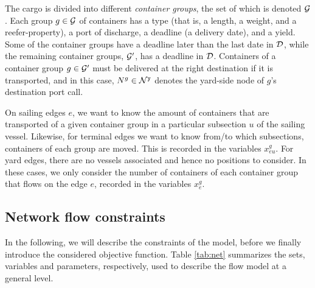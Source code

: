 The cargo is divided into different \emph{container groups}, the set of which is denoted $\mathcal{G}$. Each group $g\in \mathcal{G}$ of containers has a type (that is, a length, a weight, and a reefer-property), a port of discharge, a deadline (a delivery date), and a yield. Some of the container groups have a deadline later than the last date in $\mathcal{D}$, while the remaining container groups, $\mathcal{G}'$, has a deadline in $\mathcal{D}$. Containers of a container group $g\in\mathcal{G}'$ must be delivered at the right destination if it is transported, and in this case, $N^g \in \mathcal{N}^\texttt{y}$ denotes the yard-side node of $g$'s destination port call.  

On sailing edges $e$, we want to know the amount of containers that are transported of a given container group in a particular subsection $u$ of the sailing vessel. Likewise, for terminal edges we want to know from/to which subsections, containers of each group are moved. This is recorded in the variables $x^g_{eu}$. For yard edges, there are no vessels associated and hence no positions to consider. In these cases, we only consider the number of containers of each container group that flows on the edge $e$, recorded in the variables $x^g_e$. 

\subsection{Network flow constraints}
In the following, we will describe the constraints of the model, before we finally introduce the considered objective function. Table \ref{tab:net} summarizes the sets, variables and parameters, respectively, used to describe the flow model at a general level.

